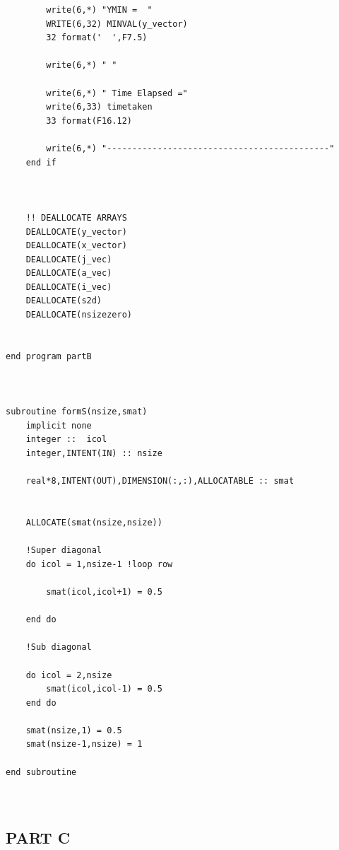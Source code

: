 \documentclass[12pt]{article}
\begin{document}
\begin{lstlisting}
        write(6,*) "YMIN =  "
        WRITE(6,32) MINVAL(y_vector)
        32 format('  ',F7.5)

        write(6,*) " "

        write(6,*) " Time Elapsed ="
        write(6,33) timetaken
        33 format(F16.12)

        write(6,*) "--------------------------------------------"
    end if

            

    !! DEALLOCATE ARRAYS
    DEALLOCATE(y_vector)
    DEALLOCATE(x_vector)
    DEALLOCATE(j_vec)
    DEALLOCATE(a_vec)
    DEALLOCATE(i_vec)
    DEALLOCATE(s2d)
    DEALLOCATE(nsizezero)


end program partB



subroutine formS(nsize,smat)
    implicit none
    integer ::  icol
    integer,INTENT(IN) :: nsize
    
    real*8,INTENT(OUT),DIMENSION(:,:),ALLOCATABLE :: smat


    ALLOCATE(smat(nsize,nsize))

    !Super diagonal
    do icol = 1,nsize-1 !loop row
       
        smat(icol,icol+1) = 0.5
      
    end do

    !Sub diagonal

    do icol = 2,nsize
        smat(icol,icol-1) = 0.5
    end do
   
    smat(nsize,1) = 0.5
    smat(nsize-1,nsize) = 1

end subroutine

       
   \end{lstlisting}

   \newpage
   \subsection{PART C}
\end{document}
